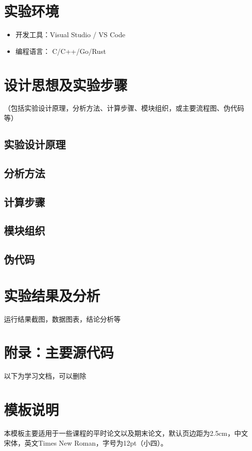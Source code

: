 \documentclass[12pt,hyperref,a4paper,UTF8]{ctexart}
\begin{document}
\section{实验环境}
    \begin{itemize}
        \item 开发工具：Visual Studio / VS Code
        \item 编程语言： C/C++/Go/Rust
    \end{itemize}

\section{设计思想及实验步骤}
（包括实验设计原理，分析方法、计算步骤、模块组织，或主要流程图、伪代码等）

\subsection{实验设计原理}

\subsection{分析方法}

\subsection{计算步骤}

\subsection{模块组织}

\subsection{伪代码}

\section{实验结果及分析}
运行结果截图，数据图表，结论分析等

\section{附录：主要源代码}



\newpage
    以下为学习文档，可以删除
\section{模板说明}
本模板主要适用于一些课程的平时论文以及期末论文，默认页边距为2.5cm，中文宋体，英文Times New Roman，字号为12pt（小四）。
\end{document}
